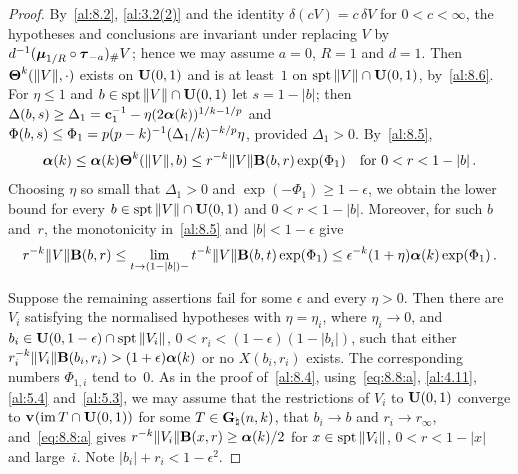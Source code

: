 \begin{proof}
    By~\ref{al:8.2}, \ref{al:3.2(2)} and the identity $\delta(c V) = c \, \delta V$ for $0 < c <
    \infty$, the hypotheses and conclusions are invariant under replacing $V$ by $d^{-1}
    (\boldsymbol{\mu}_{1/R} \circ \boldsymbol{\tau}_{-a})_\# V$; hence we may assume $a = 0$, $R = 1$ and $d = 1$. Then
    $\boldsymbol{\Theta}^{k}(\|V\|,\cdot)$ exists on $\mathbf{U}(0,1)$ and is at least~$1$ on $\operatorname{spt} \|V\|
    \cap \mathbf{U}(0,1)$, by~\ref{al:8.6}. For $\eta \le 1$ and $b \in \operatorname{spt} \|V\| \cap \mathbf{U}(0,1)$
    let $s = 1 - |b|$; then $\Delta(b,s) \ge \Delta_1 = \mathbf{c}_1^{-1} - \eta (2
    \boldsymbol{\alpha}(k))^{1/k - 1/p}$ and $\Phi(b,s) \le \Phi_1 = p (p-k)^{-1}
    (\Delta_1/k)^{-k/p} \eta$, provided $\Delta_1 > 0$. By~\ref{al:8.5},
    \begin{equation}
        \label{eq:8.8:a}
        \boldsymbol{\alpha}(k) \le \boldsymbol{\alpha}(k) \boldsymbol{\Theta}^{k}(\|V\|,b) \le r^{-k} \|V\|
        \mathbf{B}(b,r) \exp(\Phi_1) \quad \text{for $0 < r < 1 - |b|$} \,.
    \end{equation}
    Choosing $\eta$ so small that $\Delta_1 > 0$ and $\exp(-\Phi_1) \ge 1 - \epsilon$, we obtain the
    lower bound for every $b \in \operatorname{spt} \|V\| \cap \mathbf{U}(0,1)$ and $0 < r < 1 - |b|$. Moreover, for
    such $b$ and~$r$, the monotonicity in~\ref{al:8.5} and $|b| < 1 - \epsilon$ give
    \begin{equation}
        \label{eq:8.8:b}
        r^{-k} \|V\| \mathbf{B}(b,r) \le \lim_{t \to (1-|b|)-} t^{-k} \|V\| \mathbf{B}(b,t)
        \exp(\Phi_1) \le \epsilon^{-k} (1 + \eta) \boldsymbol{\alpha}(k) \exp(\Phi_1) \,.
    \end{equation}

    Suppose the remaining assertions fail for some $\epsilon$ and every $\eta > 0$. Then there are
    $V_i$ satisfying the normalised hypotheses with $\eta = \eta_i$, where $\eta_i \to 0$, and $b_i
    \in \mathbf{U}(0,1-\epsilon) \cap \operatorname{spt} \|V_i\|$, $0 < r_i < (1 - \epsilon)(1 - |b_i|)$, such that
    either $r_i^{-k} \|V_i\| \mathbf{B}(b_i,r_i) > (1 + \epsilon) \boldsymbol{\alpha}(k)$ or no
    $X(b_i,r_i)$ exists. The corresponding numbers $\Phi_{1,i}$ tend to~$0$. As in the proof
    of~\ref{al:8.4}, using~\eqref{eq:8.8:a}, \ref{al:4.11}, \ref{al:5.4} and~\ref{al:5.3}, we may
    assume that the restrictions of $V_i$ to $\mathbf{U}(0,1)$ converge to $\mathbf{v}_{}(\operatorname{im} T \cap
    \mathbf{U}(0,1))$ for some $T \in \mathbf{G}_{\natural}(n,k)$, that $b_i \to b$ and $r_i \to r_\infty$,
    and~\eqref{eq:8.8:a} gives $r^{-k} \|V_i\| \mathbf{B}(x,r) \ge \boldsymbol{\alpha}(k)/2$ for $x
    \in \operatorname{spt} \|V_i\|$, $0 < r < 1 - |x|$ and large~$i$. Note $|b_i| + r_i < 1 - \epsilon^2$.


\end{proof}
